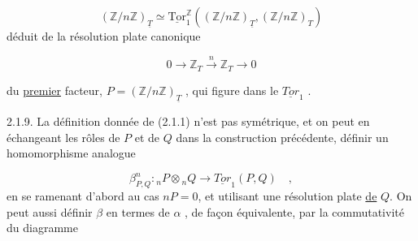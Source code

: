 \begin{equation}\tag{2.1.8.1}
(\mathbb{Z}/n\mathbb{Z})_{\underline{T}} \simeq \underline{\mathrm{Tor}}_1^{\mathbb{Z}}((\mathbb{Z}/ n\mathbb{Z})_{\underline{T}},(\mathbb{Z}/n\mathbb{Z})_T)
\end{equation}
déduit de la résolution plate canonique

\begin{equation}\tag{2.1.8.2}
0 \longrightarrow \mathbb{Z}_T \stackrel{n}{\longrightarrow} \mathbb{Z}_T \longrightarrow 0
\end{equation}


 du \underline{premier} facteur, $P = (\mathbb{Z}/n\mathbb{Z})_{\underline{T}}$ , qui figure dans le $\underline{Tor}_1$ .

2.1.9. La définition donnée de (2.1.1) n'est pas symétrique, et on peut en échangeant les rôles de $P$ et de $Q$ dans la construction précédente, définir un homomorphisme analogue

\begin{equation}\tag{2.1.9.1}
\beta^n_{P,Q} : {}_nP \otimes {}_nQ \longrightarrow \underline{Tor}_1(P,Q) \quad ,
\end{equation}
en se ramenant d'abord au cas $nP=0$, et utilisant une résolution plate \underline{de} $Q$. On peut aussi définir $\beta$ en termes de $\alpha$ , de façon équivalente, par la commutativité du diagramme

